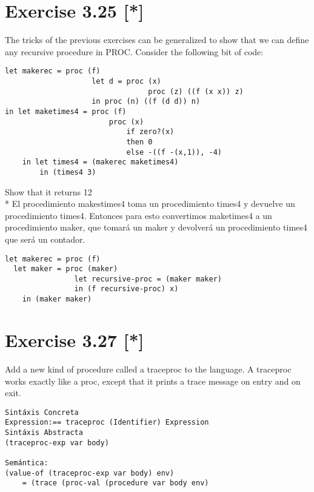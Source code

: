 \documentclass{article}
\begin{document}
\section{Exercise 3.25 [*] }
The tricks of the previous exercises can be generalized to show that we can define any recursive procedure in PROC. Consider the following bit of code:

\begin{Verbatim}
let makerec = proc (f)
                    let d = proc (x)
                                 proc (z) ((f (x x)) z)
                    in proc (n) ((f (d d)) n)
in let maketimes4 = proc (f)
                        proc (x)
                            if zero?(x)
                            then 0
                            else -((f -(x,1)), -4)
    in let times4 = (makerec maketimes4)
        in (times4 3)
\end{Verbatim}
Show that it returns 12 \\*
El procedimiento makestimes4 toma un procedimiento times4 y devuelve un procedimiento times4. Entonces para esto convertimos maketimes4 a un procedimiento maker, que tomará un maker y devolverá un procedimiento times4 que será un contador. 

\begin{Verbatim}
let makerec = proc (f)
  let maker = proc (maker)
                let recursive-proc = (maker maker)
                in (f recursive-proc) x)
    in (maker maker) 
\end{Verbatim}
\section{Exercise 3.27 [*]}
Add a new kind of procedure called a traceproc to the language. A traceproc works exactly like a proc, except that it prints a trace message on
entry and on exit.
\begin{Verbatim}
Sintáxis Concreta
Expression:== traceproc (Identifier) Expression
Sintáxis Abstracta
(traceproc-exp var body)

Semántica:
(value-of (traceproc-exp var body) env) 
    = (trace (proc-val (procedure var body env) 
\end{Verbatim}
\end{document}
